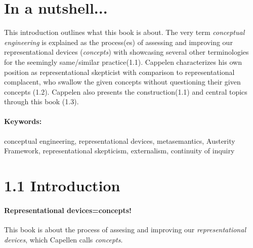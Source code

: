 \documentclass[
10pt, %
a4paper, %
twocolumn, %
landscape %
]{article}
\begin{document}
\pagestyle{myheadings} %
\markright{\doctitle} %


\thispagestyle{plain} %

\printtitle %


\section*{In a nutshell... }
This introduction outlines what this book is about.
The very term \emph{conceptual engineering} is explained as the process(es) of assessing and improving our representational devices (\emph{concepts}) with showcasing several other terminologies for the seemingly same/similar practice(1.1).
Cappelen characterizes his own position as representational skepticist with comparison to representational complacent, who swallow the given concepts without questioning their given concepts (1.2).
Cappelen also presents the construction(1.1)  and central topics through this book (1.3).

\paragraph{Keywords:}
conceptual engineering,
representational devices,
metasemantics,
Austerity Framework,
representational skepticism,
externalism,
continuity of inquiry

\section*{1.1 Introduction}
\paragraph{Representational devices=concepts!}
This book is about the process of assesing and improving our \emph{representational devices}, which Capellen calls \emph{concepts}.
\end{document}
